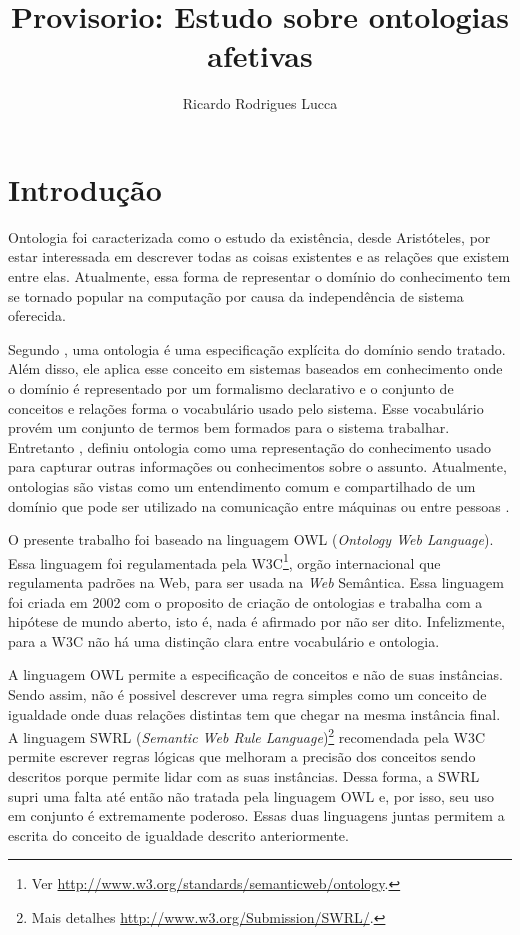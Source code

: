\documentclass[12pt]{sa}
\title{Provisorio: Estudo sobre ontologias afetivas}
\author{Ricardo Rodrigues Lucca}
\newcommand{\citet}{\citeonline}
\begin{document}
\maketitle


\section{Introdução}

Ontologia foi caracterizada como o estudo da existência, desde Aristóteles,
por estar interessada em descrever todas as coisas existentes e as relações
que existem entre elas. Atualmente, essa forma de representar o domínio do
conhecimento tem se tornado popular na computação por causa da independência
de sistema oferecida.

Segundo \citet{gruber1993translation}, uma ontologia é uma especificação explícita do
domínio sendo tratado. Além disso, ele aplica esse conceito em sistemas
baseados em conhecimento onde o domínio é representado por um formalismo
declarativo e o conjunto de conceitos e relações forma o vocabulário usado
pelo sistema. Esse vocabulário provém um conjunto de termos bem formados para
o sistema trabalhar.
%
Entretanto \citet{ontoly2004Approach}, definiu ontologia como uma representação
do conhecimento usado para capturar outras informações ou conhecimentos sobre
o assunto. Atualmente, ontologias são vistas como um entendimento comum e
compartilhado de um domínio que pode ser utilizado na comunicação entre
máquinas ou entre pessoas \cite{wks2008towards}.

O presente trabalho foi baseado na linguagem OWL (\emph{Ontology Web
Language}). Essa linguagem foi regulamentada pela W3C\footnote{Ver
\url{http://www.w3.org/standards/semanticweb/ontology}.}, orgão internacional
que regulamenta padrões na Web, para ser usada na \emph{Web} Semântica.
Essa linguagem foi criada em 2002 com o proposito de criação de ontologias e
trabalha com a hipótese de mundo aberto, isto é, nada é afirmado por não ser
dito. Infelizmente, para a W3C não há uma distinção clara entre vocabulário e
ontologia.

A linguagem OWL permite a especificação de conceitos e não de suas instâncias.
Sendo assim, não é possivel descrever uma regra simples como um conceito de
igualdade onde duas relações distintas tem que chegar na mesma instância
final. %
%
A linguagem SWRL (\emph{Semantic Web Rule
Language})\footnote{Mais detalhes \url{http://www.w3.org/Submission/SWRL/}.}
recomendada pela W3C permite escrever regras lógicas que melhoram a
precisão dos conceitos sendo descritos porque permite lidar com as suas
instâncias. Dessa forma, a SWRL supri uma falta até então não tratada pela
linguagem OWL e, por isso, seu uso em conjunto é extremamente poderoso. Essas
duas linguagens juntas permitem a escrita do conceito de igualdade descrito
anteriormente.
\end{document}
